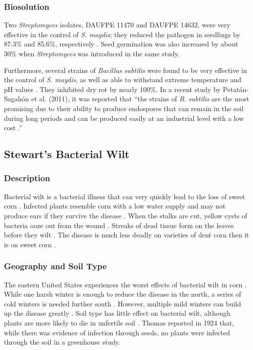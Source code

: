\documentclass[12pt]{article}
\begin{document}
\subsubsection{Biosolution}

Two \emph{Streptomyces} isolates, DAUFPE 11470 and DAUFPE 14632, were very effective in the control of \emph{S. maydis}; they reduced the pathogen in seedlings by 87.3\% and 85.6\%, respectively \autocite{bressan2005biological, bressan2003biological}. Seed germination was also increased by about 30\% when \emph{Streptomyces} was introduced in the same study.

Furthermore, several strains of \emph{Bacillus subtilis} were found to be very effective in the control of \emph{S. maydis}, as well as able to withstand extreme temperature and pH values \autocite{petatan2011isolation}. They inhibited dry rot by nearly 100\%. In a recent study by Petat{\'a}n-Sagah{\'o}n et al. (2011), it was reported that ``the strains of \emph{B. subtilis} are the most promising due to their ability to produce endospores that can remain
in the soil during long periods and can be produced easily at an industrial level with a low cost \autocite{stein2005bacillus}.''


\subsection{Stewart's Bacterial Wilt}

\subsubsection{Description}

Bacterial wilt is a bacterial illness that can very quickly lead to the loss of sweet corn \autocite{robert1967bacterial}. Infected plants resemble corn with a low water supply and may not produce ears if they survive the disease \autocite{ullstrup1961corn}. When the stalks are cut, yellow cysts of bacteria ooze out from the wound \autocite{ullstrup1961corn}. Streaks of dead tissue form on the leaves before they wilt \autocite{robert1967bacterial}. The disease is much less deadly on varieties of dent corn then it is on sweet corn \autocite{rand1933bacterial}.

\subsubsection{Geography and Soil Type}

The eastern United States experiences the worst effects of bacterial wilt in corn \autocite{ullstrup1961corn, robert1967bacterial}. While one harsh winter is enough to reduce the disease in the north, a series of cold winters is needed further south \autocite{robert1967bacterial}. However, multiple mild winters can build up the disease greatly \autocite{robert1967bacterial}. Soil type has little effect on bacterial wilt, although plants are more likely to die in unfertile soil \autocite{ullstrup1961corn, thomas1924stewart}. Thomas reported in 1924 that, while there was evidence of infection through seeds, no plants were infected through the soil in a greenhouse study.
\end{document}
